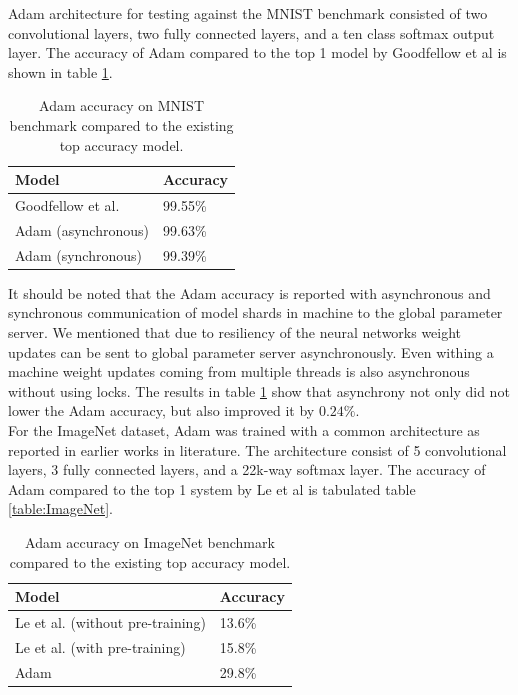 \documentclass[runningheads,a4paper]{llncs}
\begin{document}
{Adam architecture for testing against the MNIST benchmark consisted of two convolutional layers, two fully connected layers, and a ten class softmax output layer\cite{simard2003best}. The accuracy of Adam compared to the top 1  model by Goodfellow et al \cite{goodfellow2013maxout} is shown in table \ref{table:MNIST}.

\begin{table}
	\centering
	\caption{Adam accuracy on MNIST benchmark compared to the existing top accuracy model.}
	\begin{tabular}{ |p{5cm}|p{2cm}|  }
		\hline
		\textbf{Model} & \textbf{Accuracy} \\
		\hline
		Goodfellow et al. & 99.55\%\\
		\hline
		Adam (asynchronous) & 99.63\% \\
		\hline
		Adam (synchronous) & 99.39\% \\
		
		\hline
		
	\end{tabular}
	\label{table:MNIST}
\end{table}

It should be noted that the Adam accuracy is reported with asynchronous and synchronous communication of model shards in machine to the global parameter server. We mentioned that due to resiliency of the neural networks weight updates can be sent to global parameter server asynchronously. Even withing a machine weight updates coming from multiple threads is also asynchronous without using locks. The results in table \ref{table:MNIST} show that asynchrony not only did not lower the Adam accuracy, but also improved it by $0.24\%$.\\

For the ImageNet dataset, Adam was trained with a common architecture as reported in earlier works in literature. The architecture consist of 5 convolutional layers, 3 fully connected layers, and a 22k-way softmax layer. The accuracy of Adam compared to the top 1 system by Le et al \cite{le2013building} is tabulated table \ref{table:ImageNet}.

\begin{table}
	\centering
	\caption{Adam accuracy on ImageNet benchmark compared to the existing top accuracy model.}
	\begin{tabular}{ |p{5cm}|p{2cm}|  }
		\hline
		\textbf{Model} & \textbf{Accuracy} \\
		\hline
		Le et al. (without pre-training) & 13.6\%\\
		\hline
		Le et al. (with pre-training)  & 15.8\% \\
		\hline
		Adam & 29.8\% \\
		

\end{tabular}
\end{table}}
\end{document}
